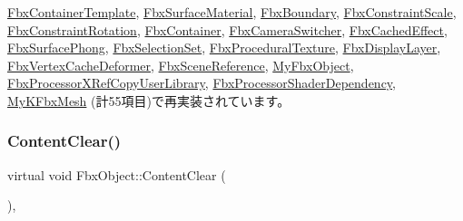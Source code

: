 \hyperlink{class_fbx_container_template_ae43300ebc308b87a6aae824daff21158}{Fbx\+Container\+Template}, \hyperlink{class_fbx_surface_material_aafc5d21293bea6b63a6ea96fa9fe0bb2}{Fbx\+Surface\+Material}, \hyperlink{class_fbx_boundary_acb50e021b1e9920026c975613a949537}{Fbx\+Boundary}, \hyperlink{class_fbx_constraint_scale_af34ea4ce8516d69aefbcb9e83060b2c1}{Fbx\+Constraint\+Scale}, \hyperlink{class_fbx_constraint_rotation_ad9f6469905777a18e3a383f402bdd9b0}{Fbx\+Constraint\+Rotation}, \hyperlink{class_fbx_container_a27222c85d2076c036d1596c25cbc9cd0}{Fbx\+Container}, \hyperlink{class_fbx_camera_switcher_a38011053f3a61df4e93989d7c970fa16}{Fbx\+Camera\+Switcher}, \hyperlink{class_fbx_cached_effect_a0a33b753735747046809b241eadb19d2}{Fbx\+Cached\+Effect}, \hyperlink{class_fbx_surface_phong_aa4262a042d35769e8ff745d408315bf9}{Fbx\+Surface\+Phong}, \hyperlink{class_fbx_selection_set_adcb0af5e3ecfd0957fbf0fe6958d8d6b}{Fbx\+Selection\+Set}, \hyperlink{class_fbx_procedural_texture_ae718dfc2092f735a1b6bcd724029a36c}{Fbx\+Procedural\+Texture}, \hyperlink{class_fbx_display_layer_a5712965749ccf41c758913d2a0ebc0c9}{Fbx\+Display\+Layer}, \hyperlink{class_fbx_vertex_cache_deformer_aed14ffc10416f556b602b87e8d8d6926}{Fbx\+Vertex\+Cache\+Deformer}, \hyperlink{class_fbx_scene_reference_a93aabe2339dc932673dacb8be72eb813}{Fbx\+Scene\+Reference}, \hyperlink{class_my_fbx_object_ac56c33fb1ab6c49ac48346ef64e7c80a}{My\+Fbx\+Object}, \hyperlink{class_fbx_processor_x_ref_copy_user_library_a52eeb515bf8df31ec5d098697fe494b3}{Fbx\+Processor\+X\+Ref\+Copy\+User\+Library}, \hyperlink{class_fbx_processor_shader_dependency_a077ea3e1c83d0a42e597c60153fa5e9a}{Fbx\+Processor\+Shader\+Dependency}, \hyperlink{class_my_k_fbx_mesh_a9fc01e7c17e2e1456cf7859f05d253e8}{My\+K\+Fbx\+Mesh} (計55項目)で再実装されています。

\mbox{\label{class_fbx_object_a284f2a438579fcacd8bffd85f556dde2}} 
\subsubsection{\texorpdfstring{Content\+Clear()}{ContentClear()}}
{\footnotesize\ttfamily virtual void Fbx\+Object\+::\+Content\+Clear (\begin{DoxyParamCaption}{ }\end{DoxyParamCaption})\hspace{0.3cm}{\ttfamily [protected]}, {\ttfamily [virtual]}}

